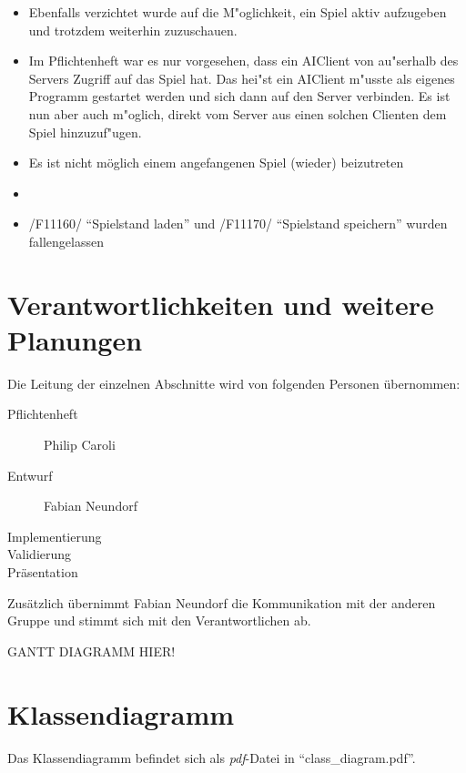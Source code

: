 \documentclass[a4paper,10pt]{article}
\begin{document}
\begin{itemize}
\item Ebenfalls verzichtet wurde auf die M"oglichkeit, ein Spiel aktiv aufzugeben und trotzdem weiterhin zuzuschauen.
\item Im Pflichtenheft war es nur vorgesehen, dass ein AIClient von au"serhalb des Servers Zugriff auf das Spiel hat. Das hei"st ein AIClient m"usste als eigenes Programm gestartet werden und sich dann auf den Server verbinden. Es ist nun aber auch m"oglich, direkt vom Server aus einen solchen Clienten dem Spiel hinzuzuf"ugen.
\item Es ist nicht möglich einem angefangenen Spiel (wieder) beizutreten
\item 
\item /F11160/ "`Spielstand laden"' und /F11170/ "`Spielstand speichern"' wurden fallengelassen 
\end{itemize}
\section{Verantwortlichkeiten und weitere Planungen}
Die Leitung der einzelnen Abschnitte wird von folgenden Personen übernommen:
\begin{description}
\item[Pflichtenheft] Philip Caroli
\item[Entwurf] Fabian Neundorf
\item[Implementierung]
\item[Validierung]
\item[Präsentation]
\end{description}
Zusätzlich übernimmt Fabian Neundorf die Kommunikation mit der anderen Gruppe und stimmt sich mit den Verantwortlichen ab.

GANTT DIAGRAMM HIER!
\section{Klassendiagramm}
Das Klassendiagramm befindet sich als \textit{pdf}-Datei in "`class\_diagram.pdf"'.
\end{document}
